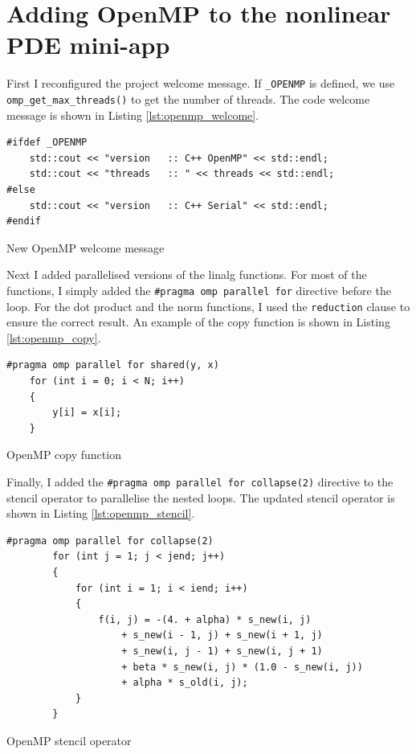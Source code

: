 \documentclass[unicode,11pt,a4paper,oneside,numbers=endperiod,openany]{scrartcl}
\begin{document}
\section{Adding OpenMP to the nonlinear PDE mini-app}

First I reconfigured the project welcome message. If \texttt{_OPENMP} is defined, we use \texttt{omp_get_max_threads()} to get the number of threads. The code welcome message is shown in Listing \ref{lst:openmp_welcome}.

\begin{listing}[h!t]
    \begin{verbatim}
#ifdef _OPENMP
    std::cout << "version   :: C++ OpenMP" << std::endl;
    std::cout << "threads   :: " << threads << std::endl;
#else
    std::cout << "version   :: C++ Serial" << std::endl;
#endif
    \end{verbatim}
    \caption{New OpenMP welcome message}
    \label{lst:openmp_welcome}
\end{listing}


Next I added parallelised versions of the linalg functions. For most of the functions, I simply added the \texttt{#pragma omp parallel for} directive before the loop. For the dot product and the norm functions, I used the \texttt{reduction} clause to ensure the correct result. An example of the copy function is shown in Listing \ref{lst:openmp_copy}.

\begin{listing}[h!t]
    \begin{verbatim}
#pragma omp parallel for shared(y, x)
    for (int i = 0; i < N; i++)
    {
        y[i] = x[i];
    }
    \end{verbatim}
    \caption{OpenMP copy function}
    \label{lst:openmp_copy}
\end{listing}

Finally, I added the \texttt{#pragma omp parallel for collapse(2)} directive to the stencil operator to parallelise the nested loops. The updated stencil operator is shown in Listing \ref{lst:openmp_stencil}.

\begin{listing}[h!t]
    \begin{verbatim}
#pragma omp parallel for collapse(2)
        for (int j = 1; j < jend; j++)
        {
            for (int i = 1; i < iend; i++)
            {
                f(i, j) = -(4. + alpha) * s_new(i, j) 
                    + s_new(i - 1, j) + s_new(i + 1, j) 
                    + s_new(i, j - 1) + s_new(i, j + 1) 
                    + beta * s_new(i, j) * (1.0 - s_new(i, j)) 
                    + alpha * s_old(i, j);    
            }
        }
    \end{verbatim}
    \caption{OpenMP stencil operator}
    \label{lst:openmp_stencil}
\end{listing}
\end{document}
